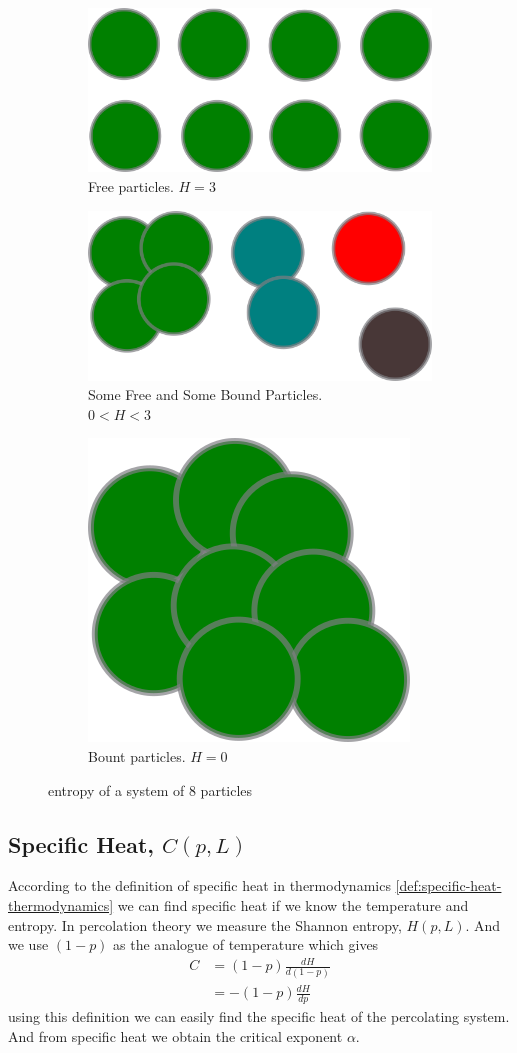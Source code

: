 	\begin{figure}
		\begin{subfigure}{.5\textwidth}
			\includegraphics[width=.5\linewidth]{entropy_cluster/step1.png}
			\caption{Free particles. $H=3$}
		\end{subfigure}
		\begin{subfigure}{.5\textwidth}
			\includegraphics[width=.5\linewidth]{entropy_cluster/step2.png}
			\caption{Some Free and Some Bound Particles.\\ $0 < H < 3$}
		\end{subfigure}
		\begin{subfigure}{.5\textwidth}
			\includegraphics[width=.5\linewidth]{entropy_cluster/step3.png}
			\caption{Bount particles. $H=0$}
		\end{subfigure}
		\caption{entropy of a system of $8$ particles}
	\end{figure}
	

	\subsection{Specific Heat, $C(p,L)$}
	According to the definition of specific heat in thermodynamics \ref{def:specific-heat-thermodynamics}  we can find specific heat if we know the temperature and entropy. In percolation theory we measure the Shannon entropy, $H(p,L)$. And we use $(1-p)$ as the analogue of temperature which gives
	\begin{align}
		C &= (1-p) \frac{dH}{d(1-p)} \\
		  &= -(1-p) \frac{dH}{dp}
		  \label{def:specific-heat-percolation}
	\end{align}
	using this definition we can easily find the specific heat of the percolating system. And from specific heat we obtain the critical exponent $\alpha$.
	
